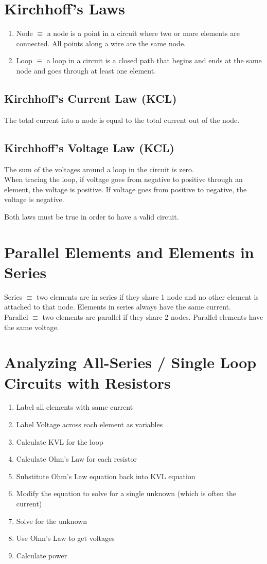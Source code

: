 \documentclass{article}
\begin{document}
\section{Kirchhoff's Laws}
\begin{enumerate}
  \item {
  Node $\equiv$ a node is a point in a circuit where two or more elements are connected. All points along a wire are the same node.
  }
  \item {
  Loop $\equiv$ a loop in a circuit is a closed path that begins and ends at the same node and goes through at least one element.
  }
\end{enumerate}

\subsection{Kirchhoff's Current Law (KCL)}
The total current into a node is equal to the total current out of the node.

\subsection{Kirchhoff's Voltage Law (KCL)}
The sum of the voltages around a loop in the circuit is zero.\\
When tracing the loop, if voltage goes from negative to positive through an element, the voltage is positive. If voltage goes from positive to negative, the voltage is negative.

Both laws must be true in order to have a valid circuit.

\section{Parallel Elements and Elements in Series}
Series $\equiv$ two elements are in series if they share 1 node and no other element is attached to that node. Elements in series always have the same current.\\
Parallel $\equiv$ two elements are parallel if they share 2 nodes. Parallel elements have the same voltage.

\section{Analyzing All-Series / Single Loop Circuits with Resistors}
\begin{enumerate}
  \item Label all elements with same current
  \item Label Voltage across each element as variables
  \item Calculate KVL for the loop
  \item Calculate Ohm's Law for each resistor
  \item Substitute Ohm's Law equation back into KVL equation
  \item Modify the equation to solve for a single unknown (which is often the current)
  \item Solve for the unknown
  \item Use Ohm's Law to get voltages
  \item Calculate power
\end{enumerate}
\end{document}
